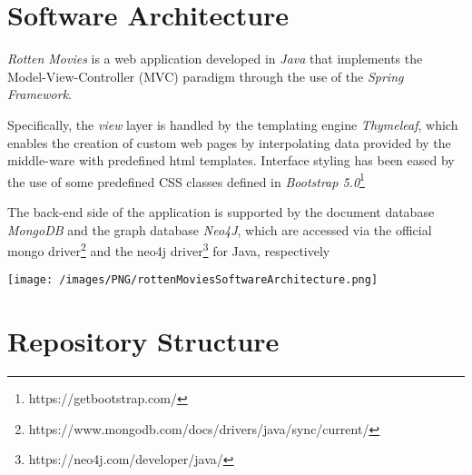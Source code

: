 %
%

\chapter{Software Architecture}
\emph{Rotten Movies} is a web application developed in \emph{Java} that implements the Model-View-Controller (MVC) paradigm through
the use of the \emph{Spring Framework}. 

Specifically, the \emph{view} layer is handled by the templating engine \emph{Thymeleaf}, 
which enables the creation of custom web pages by interpolating data provided by the middle-ware with predefined html templates.
Interface styling has been eased by the use of some predefined CSS classes defined in \emph{Bootstrap 5.0}\footnote{https://getbootstrap.com/}

The back-end side of the application is supported by the document database \emph{MongoDB} and the graph database \emph{Neo4J}, 
which are accessed via the official mongo driver\footnote{https://www.mongodb.com/docs/drivers/java/sync/current/} and the 
neo4j driver\footnote{https://neo4j.com/developer/java/} for Java, respectively

\hspace{2em}

\texttt{[image: /images/PNG/rottenMoviesSoftwareArchitecture.png]}

\chapter{Repository Structure}


%